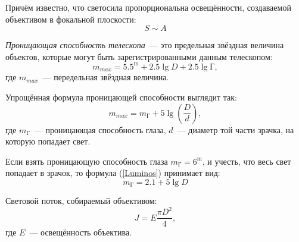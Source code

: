 Причём известно, что светосила пропорциональна освещённости, создаваемой объективом в фокальной плоскости:
\begin{equation}
S\sim A
\end{equation}

\textit{Проницающая способность телескопа}~--- это предельная звёздная величина объектов, которые могут быть зарегистрированными данным телескопом:
\begin{equation}
m_{max}=5.5^{\text{m}}+2.5\lg{D}+2.5\lg{\text{Г}},
\end{equation}
где $m_{max}$~--- передельная звёздная величина.

Упрощённая формула проницающей способности выглядит так:
\begin{equation}\label{Luminos}
m_{max}=m_{\text{Г}}+5\lg\left(\frac{D}{d}\right),
\end{equation}
где $m_{\text{Г}}$~--- проницающая способность глаза, $d$~--- диаметр той части зрачка, на которую попадает свет.

Если взять проницающую способность глаза $m_{\text{Г}}=6^{\text{m}}$, и учесть, что весь свет попадает в зрачок, то формула (\ref{Luminos}) принимает вид:
\begin{equation}
m_{\text{Г}}=2.1+5\lg{D}
\end{equation}

Световой поток, собираемый объективом:
\begin{equation}
J=E\frac{\pi D^2}{4},
\end{equation}
где $E$~--- освещённость объектива.